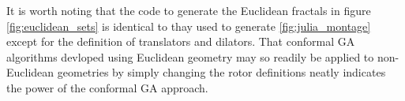 It is worth noting that the code to generate the Euclidean fractals in figure 
\ref{fig:euclidean_sets} is identical to thay used to generate
\ref{fig:julia_montage} except for the 
definition of translators and dilators.
That conformal GA algorithms devloped using Euclidean geometry may so readily
be applied to non-Euclidean geometries by simply changing the rotor definitions neatly
indicates the power of the conformal GA approach.



